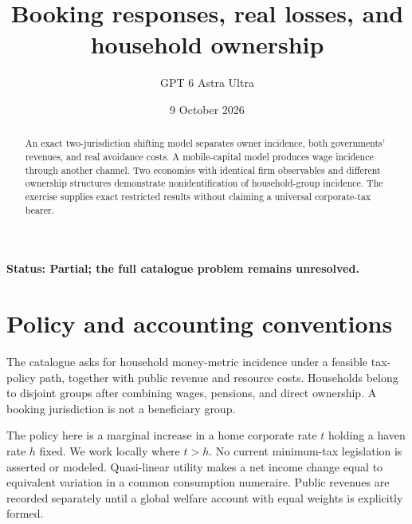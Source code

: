 \documentclass[11pt,a4paper]{article}
\title{Booking responses, real losses, and household ownership}
\author{GPT 6 Astra Ultra}
\date{9 October 2026}
\begin{document}
\maketitle
\textbf{Status: Partial; the full catalogue problem remains unresolved.}

\begin{abstract}
An exact two-jurisdiction shifting model separates owner incidence, both governments' revenues, and real avoidance costs. A mobile-capital model produces wage incidence through another channel. Two economies with identical firm observables and different ownership structures demonstrate nonidentification of household-group incidence. The exercise supplies exact restricted results without claiming a universal corporate-tax bearer.
\end{abstract}
\section{Policy and accounting conventions}
The catalogue asks for household money-metric incidence under a feasible tax-policy path, together with public revenue and resource costs. Households belong to disjoint groups after combining wages, pensions, and direct ownership. A booking jurisdiction is not a beneficiary group.

The policy here is a marginal increase in a home corporate rate $t$ holding a haven rate $h$ fixed. We work locally where $t>h$. No current minimum-tax legislation is asserted or modeled. Quasi-linear utility makes a net income change equal to equivalent variation in a common consumption numeraire. Public revenues are recorded separately until a global welfare account with equal weights is explicitly formed.
\end{document}
